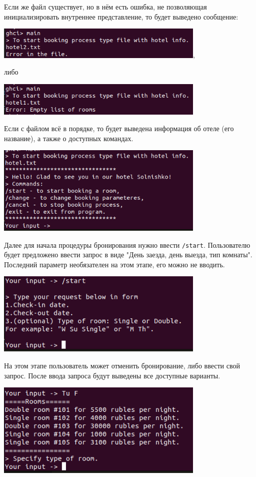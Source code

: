 \documentclass[oneside,final,14pt]{extarticle}
\begin{document}
Если же файл существует, но в нём есть ошибка, не позволяющая инициализировать внутреннее 
представление, то будет выведено сообщение:
\begin{center}
    \includegraphics[width=0.75\textwidth]{picture02.png},
\end{center}
либо
\begin{center}
    \includegraphics[width=0.75\textwidth]{picture01.png}
\end{center}

Если с файлом всё в порядке, то будет выведена информация об отеле
(его название), а также о доступных командах.
\begin{center}
\includegraphics[width=0.75\textwidth]{picture1.png}
\end{center}

Далее для начала процедуры бронирования нужно ввести \texttt{/start}.
Пользователю будет предложено ввести запрос в виде "День заезда, день выезда, 
тип комнаты". Последний параметр необязателен на этом этапе, его можно не вводить.
\begin{center}
    \includegraphics[width=0.75\textwidth]{picture2.png}
\end{center}
На этом этапе пользователь может отменить бронирование, либо ввести свой запрос.
После ввода запроса будут выведены все доступные варианты.
\begin{center}
    \includegraphics[width=0.75\textwidth]{picture3.png}
\end{center}
\end{document}
